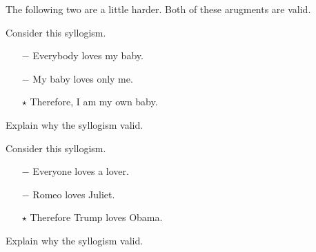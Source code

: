 The following two are a little harder.  Both of these arugments are valid.
\begin{problem}Consider this syllogism.

\ifKey
\color{red}
\begin{enumerate}
\item [$-$] Everybody loves my baby.
\item [$-$] My baby loves only me.
\item [$\star$] Therefore, I am my own baby.
\end{enumerate}

Explain why  the syllogism valid.

\vspace{1em}

\color{black}
\else
{}
\fi
\end{problem}


\begin{problem}Consider this syllogism.

\ifKey
\color{red}
\begin{enumerate}
\item [$-$] Everyone loves a lover.
\item [$-$] Romeo loves Juliet.
\item [$\star$] Therefore Trump loves Obama.
\end{enumerate}

Explain why  the syllogism valid.

\vspace{1em}

\color{black}
\else
{}
\fi
\end{problem}



